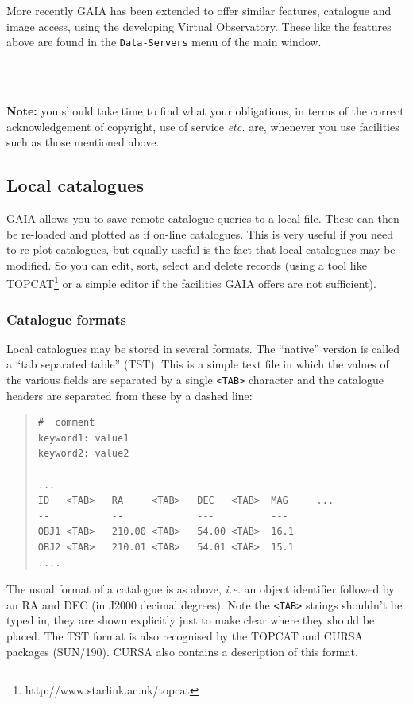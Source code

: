 \documentclass[twoside,11pt]{article}
\newcommand{\htmladdnormallinkfoot}[2]{#1\footnote{#2}}
\newcommand{\xref}[3]{#1}
\renewcommand{\_}{\texttt{\symbol{95}}}
\newcommand{\mytt}[1]{{\texttt{#1}}}
\begin{document}
More recently GAIA has been extended to offer similar features,
catalogue and image access, using the developing Virtual
Observatory. These like the features above are found in the
\mytt{Data-Servers} menu of the main window.

\begin{htmlonly}
\\
\\
\end{htmlonly}

{\bf Note:} you should take time to find what your obligations, in
terms of the correct acknowledgement of copyright, use of service
{\em etc.} are, whenever you use facilities such as those mentioned
above.

\subsection{Local catalogues}
GAIA allows you to save remote catalogue queries to a local file. These
can then be re-loaded and plotted as if on-line catalogues. This is very
useful if you need to re-plot catalogues, but equally useful is the fact
that local catalogues may be modified. So you can edit, sort, select and
delete records (using a tool like 
\htmladdnormallinkfoot{TOPCAT}{http://www.starlink.ac.uk/topcat} or a
simple editor if the facilities GAIA offers are not sufficient).

\subsubsection{Catalogue formats}
Local catalogues may be stored in several formats. The ``native''
version is called a ``tab separated table'' (TST). This is a simple
text file in which the values of the various fields are separated by a
single \mytt{<TAB>} character and the catalogue headers are separated
from these by a dashed line:
\begin{quote}
\begin{verbatim}
#  comment
keyword1: value1
keyword2: value2

...
ID   <TAB>   RA     <TAB>   DEC   <TAB>  MAG     ...
--           --             ---          ---
OBJ1 <TAB>   210.00 <TAB>   54.00 <TAB>  16.1
OBJ2 <TAB>   210.01 <TAB>   54.01 <TAB>  15.1
....
\end{verbatim}
\end{quote}
The usual format of a catalogue is as above, \textit{i.e.} an object identifier
followed by an RA and DEC (in J2000 decimal degrees). Note the
\mytt{<TAB>} strings shouldn't be typed in, they are shown explicitly
just to make clear where they should be placed. The TST format is also
recognised by the TOPCAT and CURSA packages (\xref{SUN/190}{sun190}{}).
CURSA also contains a description of this format.
\end{document}
